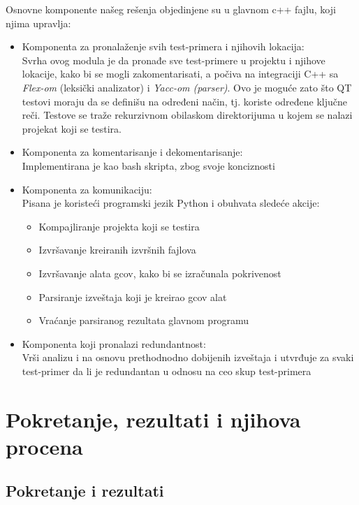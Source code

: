 \documentclass[a4paper]{article}
\begin{document}
Osnovne komponente našeg rešenja objedinjene su u glavnom c++ fajlu, koji njima upravlja:
\begin{itemize}
    \item Komponenta za pronalaženje svih test-primera i njihovih lokacija:\\
            Svrha ovog modula je da pronađe sve test-primere u projektu i njihove lokacije, kako bi se mogli zakomentarisati, a počiva na integraciji C++ sa \textit{Flex-om} (leksički analizator) i \textit{Yacc-om (parser)}. Ovo je moguće zato što QT testovi moraju da se definišu na određeni način, tj. koriste određene ključne reči. Testove se traže rekurzivnom obilaskom direktorijuma u kojem se nalazi projekat koji se testira.
    \item Komponenta za komentarisanje i dekomentarisanje:\\
            Implementirana je kao bash skripta, zbog svoje konciznosti
    \item Komponenta za komunikaciju:\\
            Pisana je koristeći programski jezik Python i obuhvata sledeće akcije:
            \begin{itemize}
                \item Kompajliranje projekta koji se testira
                \item Izvršavanje kreiranih izvršnih fajlova
                \item Izvršavanje alata gcov, kako bi se izračunala pokrivenost
                \item Parsiranje izveštaja koji je kreirao gcov alat
                \item Vraćanje parsiranog rezultata glavnom programu
            \end{itemize}
    \item Komponenta koji pronalazi redundantnost:\\
            Vrši analizu i na osnovu prethodnodno dobijenih izveštaja i utvrđuje za svaki test-primer da li je redundantan u odnosu na ceo skup test-primera
\end{itemize}

\section{Pokretanje, rezultati i njihova procena}
\label{sec:pokretanje_rezultati_procena}

\subsection{Pokretanje i rezultati}
\label{subsec:pokretanje_rezultati}
\end{document}
